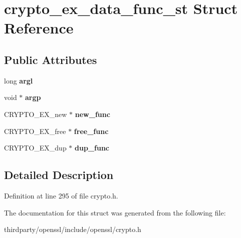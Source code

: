 \hypertarget{structcrypto__ex__data__func__st}{}\section{crypto\+\_\+ex\+\_\+data\+\_\+func\+\_\+st Struct Reference}
\label{structcrypto__ex__data__func__st}
\subsection*{Public Attributes}
\begin{DoxyCompactItemize}
\item 
\mbox{\label{structcrypto__ex__data__func__st_a3290d05d491702cb0c8c19e9e8fee261}} 
long {\bfseries argl}
\item 
\mbox{\label{structcrypto__ex__data__func__st_a06d5de8bf9d50af5c74088e9ea10c60d}} 
void $\ast$ {\bfseries argp}
\item 
\mbox{\label{structcrypto__ex__data__func__st_a83923e40c83463bdf292ed628af6db05}} 
C\+R\+Y\+P\+T\+O\+\_\+\+E\+X\+\_\+new $\ast$ {\bfseries new\+\_\+func}
\item 
\mbox{\label{structcrypto__ex__data__func__st_acce7bd60712d1319e666f1bd9fbdeabf}} 
C\+R\+Y\+P\+T\+O\+\_\+\+E\+X\+\_\+free $\ast$ {\bfseries free\+\_\+func}
\item 
\mbox{\label{structcrypto__ex__data__func__st_a3ba1b7f5fec2a001822f70e5862d72b5}} 
C\+R\+Y\+P\+T\+O\+\_\+\+E\+X\+\_\+dup $\ast$ {\bfseries dup\+\_\+func}
\end{DoxyCompactItemize}


\subsection{Detailed Description}


Definition at line 295 of file crypto.\+h.



The documentation for this struct was generated from the following file\+:\begin{DoxyCompactItemize}
\item 
thirdparty/openssl/include/openssl/crypto.\+h\end{DoxyCompactItemize}
